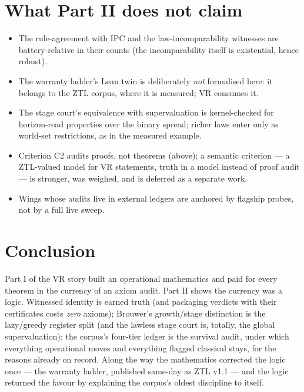 \documentclass[11pt]{article}
\theoremstyle{remark}
\begin{document}
\section{What Part II does not claim}
\label{sec:caveats}

\begin{itemize}
\item The rule-agreement with IPC and the law-incomparability witnesses are
battery-relative in their counts (the incomparability itself is
existential, hence robust).
\item The warranty ladder's Lean twin is deliberately \emph{not} formalised
here: it belongs to the ZTL corpus, where it is measured; VR consumes it.
\item The stage court's equivalence with supervaluation is kernel-checked
for horizon-read properties over the binary spread; richer laws enter only
as world-set restrictions, as in the measured example.
\item Criterion C2 audits proofs, not theorems (above); a semantic
criterion --- a ZTL-valued model for VR statements, truth in a model
instead of proof audit --- is stronger, was weighed, and is deferred as a
separate work.
\item Wings whose audits live in external ledgers are anchored by flagship
probes, not by a full live sweep.
\end{itemize}

\section{Conclusion}

Part I of the VR story built an operational mathematics and paid for every
theorem in the currency of an axiom audit. Part II shows the currency was a
logic. Witnessed identity is earned truth (and packaging verdicts with
their certificates costs \emph{zero} axioms); Brouwer's growth/stage
distinction is the lazy/greedy register split (and the lawless stage court
is, totally, the global supervaluation); the corpus's four-tier ledger is
the survival audit, under which everything operational moves and everything
flagged classical stays, for the reasons already on record. Along the way
the mathematics corrected the logic once --- the warranty ladder, published
same-day as ZTL v1.1 --- and the logic returned the favour by explaining
the corpus's oldest discipline to itself.
\end{document}
